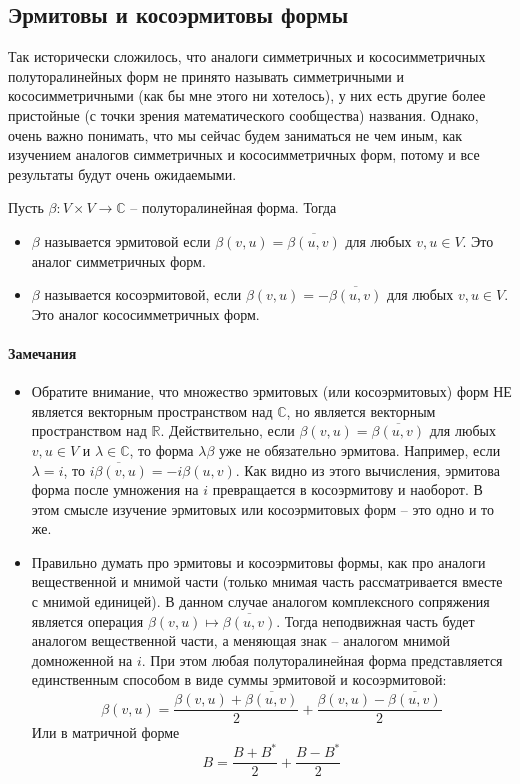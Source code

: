 \subsection{Эрмитовы и косоэрмитовы формы}

Так исторически сложилось, что аналоги симметричных и кососимметричных полуторалинейных форм не принято называть симметричными и кососимметричными (как бы мне этого ни хотелось), у них есть другие более пристойные (с точки зрения математического сообщества) названия.
Однако, очень важно понимать, что мы сейчас будем заниматься не чем иным, как изучением аналогов симметричных  и кососимметричных форм, потому и все результаты будут очень ожидаемыми.

\begin{definition}
Пусть $\beta\colon V\times V\to \mathbb C$ -- полуторалинейная форма.
Тогда 
\begin{itemize}
\item $\beta$ называется эрмитовой если $\beta(v, u) = \overline{\beta(u,v)}$ для любых $v,u\in V$.
Это аналог симметричных форм.

\item $\beta$ называется косоэрмитовой, если $\beta(v, u) = -\overline{\beta(u,v)}$ для любых $v,u\in V$.
Это аналог кососимметричных форм.
\end{itemize}
\end{definition}

\paragraph{Замечания}

\begin{itemize}
\item Обратите внимание, что множество эрмитовых (или косоэрмитовых) форм НЕ является векторным пространством над $\mathbb C$, но является векторным пространством над $\mathbb R$.
Действительно, если $\beta(v, u) = \overline{\beta(u,v)}$ для любых $v, u \in V$ и $\lambda\in \mathbb C$, то форма $\lambda \beta$ уже не обязательно эрмитова.
Например, если $\lambda = i$, то $\overline{i\beta(v,u)} = -i \beta(u,v)$.
Как видно из этого вычисления, эрмитова форма после умножения на $i$ превращается в косоэрмитову и наоборот.
В этом смысле изучение эрмитовых или косоэрмитовых форм -- это одно и то же.

\item Правильно думать про эрмитовы и косоэрмитовы формы, как про аналоги вещественной и мнимой части (только мнимая часть рассматривается вместе с мнимой единицей).
В данном случае аналогом комплексного сопряжения является операция $\beta(v,u) \mapsto \overline{\beta(u, v)}$.
Тогда неподвижная часть будет аналогом вещественной части, а меняющая знак -- аналогом мнимой домноженной на $i$.
При этом любая полуторалинейная форма представляется единственным способом в виде суммы эрмитовой и косоэрмитовой:
\[
\beta(v,u) = \frac{\beta(v, u) + \overline{\beta(u, v)}}{2} + \frac{\beta(v, u) - \overline{\beta(u, v)}}{2} 
\]
Или в матричной форме
\[
B = \frac{B + B^*}{2} + \frac{B - B^*}{2}
\]
\end{itemize}

